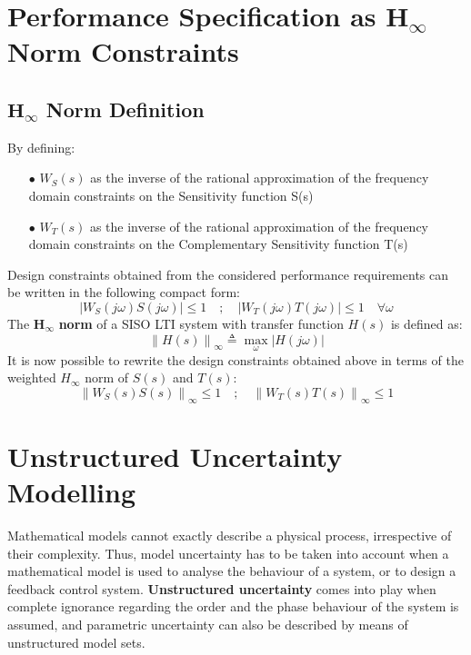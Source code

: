 \documentclass{article}
\numberwithin{equation}{subsection}
\begin{document}
	\section{Performance Specification as $\bm{H_\infty}$ Norm Constraints}
	\subsection{$\bm{H_\infty}$ Norm Definition}
	By defining:
	\begin{enumerate}
		\item[$\bullet$] $W_S(s)$ as the inverse of the rational approximation of the frequency domain constraints on the Sensitivity function S(s)
		\item[$\bullet$] $W_T(s)$ as the inverse of the rational approximation of the frequency domain constraints on the Complementary Sensitivity function T(s)
	\end{enumerate}
	Design constraints obtained from the considered performance requirements can be written in the following compact form:
	\begin{equation}
		\left| W_S(j\omega)S(j\omega) \right| \leq 1 \quad ; \quad \left| W_T(j\omega)T(j\omega) \right| \leq 1 \quad \forall\omega	
	\end{equation}
	The $\bm{H_\infty}$ \textbf{norm} of a SISO LTI system with transfer function $H(s)$ is defined as:
	\begin{equation}
		\left\lVert H(s) \right\rVert_\infty \triangleq \max_\omega \left| H(j\omega) \right|
	\end{equation}
	It is now possible to rewrite the design constraints obtained above in terms of the weighted $H_\infty$ norm of $S(s)$ and $T(s)$:
	\begin{equation}
		\left\lVert W_S(s)S(s) \right\rVert_\infty \leq 1 \quad ; \quad \left\lVert W_T(s)T(s) \right\rVert_\infty \leq 1
	\end{equation}

	\section{Unstructured Uncertainty Modelling}
	Mathematical models cannot exactly describe a physical process, irrespective of their complexity. Thus, model uncertainty has to be taken into account when a mathematical model is used to analyse the behaviour of a system, or to design a feedback control system.
	\textbf{Unstructured uncertainty} comes into play when complete ignorance regarding the order and the phase behaviour of the system is assumed, and parametric uncertainty can also be described by means of unstructured model sets.
\end{document}
